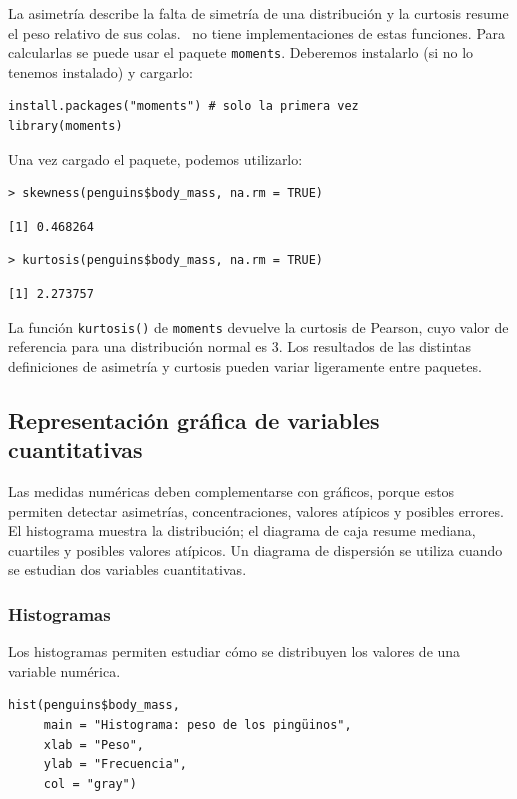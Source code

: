 \documentclass[11pt,a4paper]{article}
\newcommand{\R}{\textcolor{azuluc}{\faIcon{r-project}}}
\theoremstyle{exercise}
\begin{document}
La asimetría describe la falta de simetría de una distribución y la curtosis resume el peso relativo de sus colas. \R\ no tiene implementaciones de estas funciones. Para calcularlas se puede usar el paquete \texttt{moments}. Deberemos instalarlo (si no lo tenemos instalado) y cargarlo:
\begin{lstlisting}[style=rstyle]
install.packages("moments") # solo la primera vez
library(moments)
\end{lstlisting}
Una vez cargado el paquete, podemos utilizarlo:
\begin{lstlisting}[style=rconsole]
> skewness(penguins$body_mass, na.rm = TRUE)
\end{lstlisting}
\begin{lstlisting}[style=routput]
[1] 0.468264
\end{lstlisting}
\begin{lstlisting}[style=rconsole]
> kurtosis(penguins$body_mass, na.rm = TRUE)
\end{lstlisting}
\begin{lstlisting}[style=routput]
[1] 2.273757
\end{lstlisting}



La función \texttt{kurtosis()} de \texttt{moments} devuelve la curtosis de Pearson, cuyo valor de referencia para una distribución normal es 3. Los resultados de las distintas definiciones de asimetría y curtosis pueden variar ligeramente entre paquetes.


\subsection{Representación gráfica de variables cuantitativas}

Las medidas numéricas deben complementarse con gráficos, porque estos permiten detectar asimetrías, concentraciones, valores atípicos y posibles errores. El histograma muestra la distribución; el diagrama de caja resume mediana, cuartiles y posibles valores atípicos. Un diagrama de dispersión se utiliza cuando se estudian dos variables cuantitativas.


\subsubsection{Histogramas}

Los histogramas permiten estudiar cómo se distribuyen los valores de una variable numérica.

\begin{lstlisting}[style=rstyle]
hist(penguins$body_mass,
     main = "Histograma: peso de los pingüinos",
     xlab = "Peso",
     ylab = "Frecuencia",
     col = "gray")
\end{lstlisting}
\end{document}
